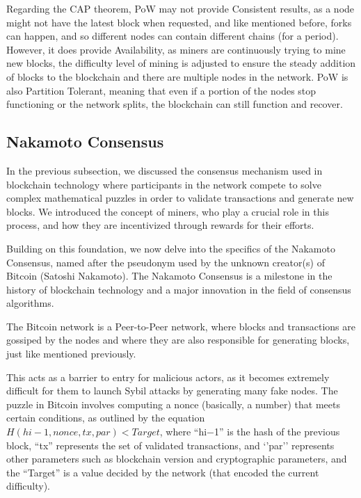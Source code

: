 Regarding the CAP theorem, PoW may not provide Consistent results, as a node might not have the latest block when requested, and like mentioned before, forks can happen, and so different nodes can contain different chains (for a period).
However, it does provide Availability, as miners are continuously trying to mine new blocks, the difficulty level of mining is adjusted to ensure the steady addition of blocks to the blockchain and there are multiple nodes in the network.
PoW is also Partition Tolerant, meaning that even if a portion of the nodes stop functioning or the network splits, the blockchain can still function and recover.

\subsection*{Nakamoto Consensus}
In the previous subsection, we discussed the consensus mechanism used in blockchain technology where participants in the network compete to solve complex mathematical puzzles in order to validate transactions and generate new blocks.
We introduced the concept of miners, who play a crucial role in this process, and how they are incentivized through rewards for their efforts.

Building on this foundation, we now delve into the specifics of the Nakamoto Consensus, named after the pseudonym used by the unknown creator(s) of Bitcoin (Satoshi Nakamoto). The Nakamoto Consensus is a milestone in the history of blockchain technology and a major innovation in the field of consensus algorithms.

The Bitcoin network is a Peer-to-Peer network, where blocks and transactions are gossiped by the nodes and where they are also responsible for generating blocks, just like mentioned previously.

This acts as a barrier to entry for malicious actors, as it becomes extremely difficult for them to launch Sybil attacks by generating many fake nodes.
The puzzle in Bitcoin involves computing a nonce (basically, a number) that meets certain conditions, as outlined by the equation $H(hi−1,nonce,tx,par) < Target$, where ``hi−1'' is the hash of the previous block, ``tx'' represents the set of validated transactions, and `'par'' represents other parameters such as blockchain version and cryptographic parameters, and the ``Target'' is a value decided by the network (that encoded the current difficulty).

